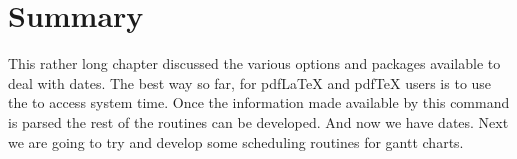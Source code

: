 \section{Summary}

This rather long chapter discussed the various options and packages available to deal with dates. The best way so far, for pdfLaTeX and pdfTeX users is to use the  to access system time. Once the information made available by this command is parsed the rest of the routines can be developed. And now we have dates. Next we are going to try and develop some scheduling routines for gantt charts.


















































